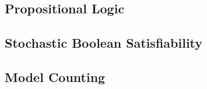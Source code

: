 \subsection{Propositional Logic}

\subsection{Stochastic Boolean Satisfiability}

\subsection{Model Counting}
